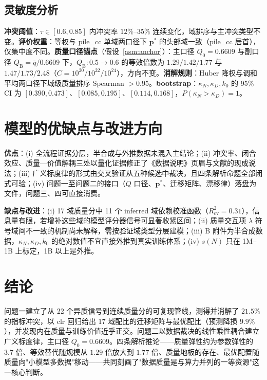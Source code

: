 \subsection{灵敏度分析}

\textbf{冲突阈值}：$\tau\in[0.6,0.85]$ 内冲突率 $12\%$--$35\%$ 连续变化，域排序与主冲突类型不变。\textbf{评价权重}：等权与 pile\_cc 单域两口径下 $\bm p^*$ 的头部域一致（pile\_cc 居首），仅集中度不同。\textbf{质量口径锚点}（假设~\ref{asm:anchor}）：主口径 $Q_0=0.6609$ 与副口径 $Q_{\mathrm B}=\bar q/0.6609$ 下，$Q_{\mathrm B}:0.5\to0.6$ 的等效倍数为 $1.29/1.42/1.77$ 与 $1.47/1.73/2.48$（$C=10^{20}/10^{22}/10^{24}$），方向不变。\textbf{消解规则}：Huber 降权与调和平均两口径下域级质量排序 Spearman $>0.95$。\textbf{bootstrap}：$\kappa_N,\kappa_D,k_0$ 的 95\% CI 为 $[0.390,0.473]$、$[0.085,0.195]$、$[0.114,0.168]$，$P(\kappa_N>\kappa_D)=1$。

\section{模型的优缺点与改进方向}

\textbf{优点}：(i) 全流程证据分层，半合成与外推数据未混入主结论；(ii) 冲突率、闭合效应、质量—价值解耦三处以量化证据修正了《数据说明》页眉与文献的现成说法；(iii) 广义标度律的形式由交叉验证从五种候选中裁决，且四条解析命题全部闭式可验；(iv) 问题一至问题二的接口（$Q$ 口径、$\bm p^*$、迁移矩阵、漂移律）落盘为文件，问题三、四可直接消费。

\textbf{缺点与改进}：(i) 17 域质量分中 11 个 inferred 域依赖校准函数（$R^2_{\mathrm{cv}}=0.31$），信息量有限，若增补这些域的模型评分器信号可显著收紧区间；(ii) 质量交互项 $\lambda$ 符号域间不一致的机制尚未解释，需按验证域类型分层建模；(iii) B 附件为半合成数据，$\kappa_N,\kappa_D,k_0$ 的绝对数值不宜直接外推到真实训练体系；(iv) $s(N)$ 只在 1M--1B 上标定，1B 以上是外推。

\section{结论}

问题一建立了从 22 个异质信号到连续质量分的可复现管线，测得并消解了 $21.5\%$ 的指标冲突，以 clr 回归给出 17 域配比的迁移矩阵与最优配比（预测降损 $9.9\%$），并发现内在质量与训练价值近乎正交。问题二以数据裁决的线性乘性耦合建立广义标度律，主口径 $Q_0=0.6609$。四条解析推论——质量弹性约为参数弹性的 $3.7$ 倍、等效替代随规模从 $1.29$ 倍放大到 $1.77$ 倍、质量地板的存在、最优配置随质量向"小模型多数据"移动——共同刻画了"数据质量是与算力并列的一等资源"这一核心判断。

